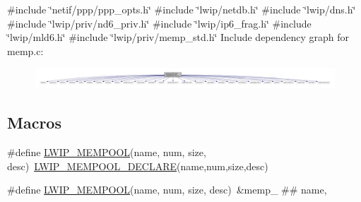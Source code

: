{\ttfamily \#include \char`\"{}netif/ppp/ppp\+\_\+opts.\+h\char`\"{}}\newline
{\ttfamily \#include \char`\"{}lwip/netdb.\+h\char`\"{}}\newline
{\ttfamily \#include \char`\"{}lwip/dns.\+h\char`\"{}}\newline
{\ttfamily \#include \char`\"{}lwip/priv/nd6\+\_\+priv.\+h\char`\"{}}\newline
{\ttfamily \#include \char`\"{}lwip/ip6\+\_\+frag.\+h\char`\"{}}\newline
{\ttfamily \#include \char`\"{}lwip/mld6.\+h\char`\"{}}\newline
{\ttfamily \#include \char`\"{}lwip/priv/memp\+\_\+std.\+h\char`\"{}}\newline
Include dependency graph for memp.\+c\+:
\nopagebreak
\begin{figure}[H]
\begin{center}
\leavevmode
\includegraphics[width=350pt]{openmote-cc2538_2lwip_2src_2core_2memp_8c__incl}
\end{center}
\end{figure}
\subsection*{Macros}
\begin{DoxyCompactItemize}
\item 
\#define \hyperlink{openmote-cc2538_2lwip_2src_2core_2memp_8c_a5f75b6e9cf0c6df9e70b08b8e05a1835}{L\+W\+I\+P\+\_\+\+M\+E\+M\+P\+O\+OL}(name,  num,  size,  desc)~\hyperlink{group__mempool_ga5b1fb3ce7942432d87cc948b1c5ed6cb}{L\+W\+I\+P\+\_\+\+M\+E\+M\+P\+O\+O\+L\+\_\+\+D\+E\+C\+L\+A\+RE}(name,num,size,desc)
\item 
\#define \hyperlink{openmote-cc2538_2lwip_2src_2core_2memp_8c_a5f75b6e9cf0c6df9e70b08b8e05a1835}{L\+W\+I\+P\+\_\+\+M\+E\+M\+P\+O\+OL}(name,  num,  size,  desc)~\&memp\+\_\+ \#\# name,
\end{DoxyCompactItemize}
